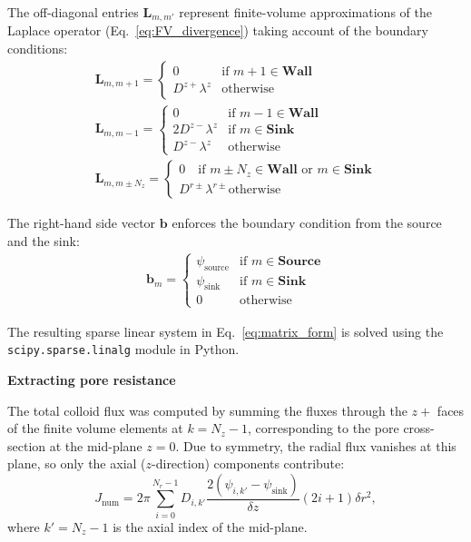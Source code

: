 \documentclass[10pt, a4paper, twocolumn]{article}
\begin{document}
The off-diagonal entries $\bm{L}_{m,m'}$ represent finite-volume approximations of the Laplace operator (Eq.~\eqref{eq:FV_divergence}) taking account of the boundary conditions:
\begin{eqnarray}
    \bm{L}_{m,m+1} =
    \begin{cases}
        0 &  \text{if } m+1 \in \textbf{Wall} \\
        D^{z+} \lambda^{z} &  \text{otherwise}
    \end{cases}
    \\
    \bm{L}_{m,m-1} =
    \begin{cases}
        0 &  \text{if } m-1 \in \textbf{Wall} \\
        2 D^{z-} \lambda^{z} & \text{if } m \in \textbf{Sink}\\
        D^{z-} \lambda^{z} &  \text{otherwise}
    \end{cases}
    \\
    \bm{L}_{m,m \pm N_z} =
    \begin{cases}
        0 \quad \text{if } m \pm N_z \in \textbf{Wall} \text{ or } m \in \textbf{Sink} \\
        D^{r\pm} \lambda^{r\pm}  \text{otherwise}
    \end{cases}
\end{eqnarray}

The right-hand side vector $\bm{b}$ enforces the boundary condition from the source and the sink:
\begin{eqnarray}
    \bm{b}_m = 
    \begin{cases}
        \psi_{\text{source}} & \text{if } m \in \textbf{Source} \\
        \psi_{\text{sink}} & \text{if } m \in \textbf{Sink} \\
        0 & \text{otherwise}
    \end{cases}
\end{eqnarray}

The resulting sparse linear system in Eq.~\eqref{eq:matrix_form} is solved using the \texttt{scipy.sparse.linalg} module in Python.


\bigskip
\textbf{Extracting pore resistance}

The total colloid flux was computed by summing the fluxes through the $z+$ faces of the finite volume elements at $k = N_z - 1$, corresponding to the pore cross-section at the mid-plane $z = 0$.
Due to symmetry, the radial flux vanishes at this plane, so only the axial ($z$-direction) components contribute:
\begin{equation}
    J_{\text{num}} = 2\pi \sum_{i=0}^{N_r-1} D_{i,k'} \frac{2(\psi_{i,k'} - \psi_{\text{sink}})}{\delta z} (2i + 1) \delta r^2,
\end{equation}
where $k' = N_z - 1$ is the axial index of the mid-plane.
\end{document}
